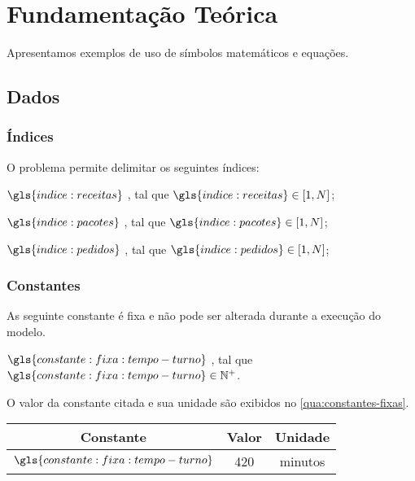 \section{Fundamentação Teórica}%
\label{sec:fundamentacao}

Apresentamos exemplos de uso de símbolos matemáticos e equações.

\subsection{Dados}

\subsubsection{Índices}

O problema permite delimitar os seguintes índices:

\begin{symbols}
    \item[\( \gls{indice:receitas} \)]
    ,
    tal que \(  \gls{indice:receitas} \in [1, N] \);

    \item[\( \gls{indice:pacotes} \)]
    ,
    tal que \(  \gls{indice:pacotes} \in [1, N] \);

    \item[\( \gls{indice:pedidos} \)]
    ,
    tal que \(  \gls{indice:pedidos} \in [1, N] \);
\end{symbols}

\subsubsection{Constantes}


As seguinte constante é fixa e não pode ser alterada durante a execução do modelo.

\begin{symbols}
    \item[\( \gls{constante:fixa:tempo-turno} \) ]
    ,
    tal que \( \gls{constante:fixa:tempo-turno} \in \mathbb{N}^{+} \).
\end{symbols}

O valor da constante citada e sua unidade são exibidos no \autoref{qua:constantes-fixas}.

\begin{quadro}
    \caption{%
        \label{qua:constantes-fixas}%
        Constantes do problema.
    }
    \begin{tabular}{|c|c|c|}
        \hline
        Constante                              &
        Valor                                  &
        Unidade
        \\
        \hline
        \( \gls{constante:fixa:tempo-turno} \) &
        420                                    &
        minutos
        \\
        \hline
    \end{tabular}
    \fonte{\ComponenteFontePropria}
\end{quadro}

